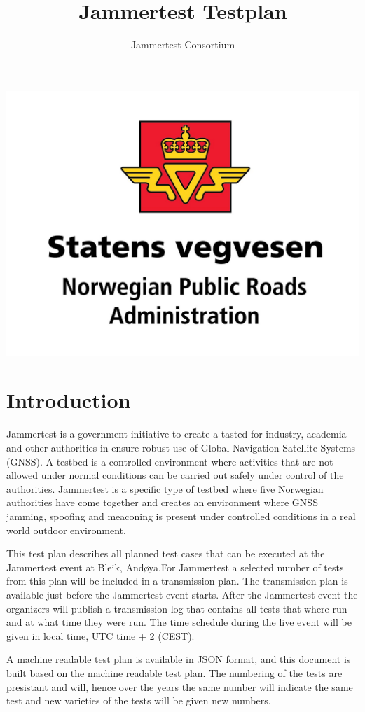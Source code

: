 \documentclass{book}
\title{Jammertest Testplan}
\author{Jammertest Consortium}
\date{ }
\begin{document}
\maketitle
\includegraphics[scale=0.1]{NPRA.png}

\tableofcontents

\section{Introduction}
Jammertest is a government initiative to create a tasted for industry, academia and other authorities in ensure robust use of Global Navigation Satellite Systems (GNSS). A testbed is a controlled environment where activities that are not allowed under normal conditions can be carried out safely under control of the authorities. Jammertest is a specific type of testbed where five Norwegian authorities have come together and creates an environment where GNSS jamming, spoofing and meaconing is present under controlled conditions in a real world outdoor environment.

This test plan describes all planned test cases that can be executed at the Jammertest event at Bleik, Andøya.For Jammertest a selected number of tests from this plan will be included in a transmission plan. The transmission plan is available just before the Jammertest event starts. After the Jammertest event the organizers will publish a transmission log that contains all tests that where run and at what time they were run. The time schedule during the live event will be given in local time, UTC time + 2 (CEST).

A machine readable test plan is available in JSON format, and this document is built based on the machine readable test plan. The numbering of the tests are presistant and will, hence over the years the same number will indicate the same test and new varieties of the tests will be given new numbers.
\end{document}
